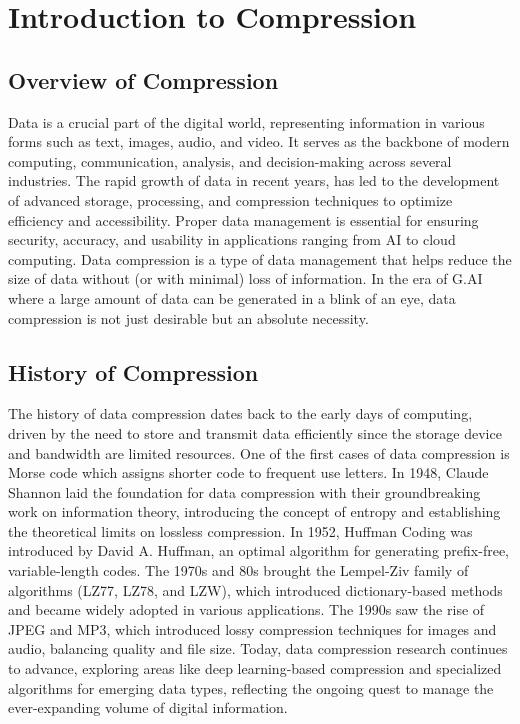 \section{Introduction to Compression}
\subsection{Overview of Compression}
Data is a crucial part of the digital world, representing information in various forms such as text, images, audio, and video. It serves as the backbone of modern computing, communication, analysis, and decision-making across several industries. The rapid growth of data in recent years, has led to the development of advanced storage, processing, and compression techniques to optimize efficiency and accessibility. Proper data management is essential for ensuring security, accuracy, and usability in applications ranging from AI to cloud computing.\newline
Data compression is a type of data management that helps reduce the size of data without (or with minimal) loss of information. In the era of G.AI where a large amount of data can be generated in a blink of an eye, data compression is not just desirable but an absolute necessity.
\subsection{History of Compression}
The history of data compression dates back to the early days of computing, driven by the need to store and transmit data efficiently since the storage device and bandwidth are limited resources. One of the first cases of data compression is Morse code which assigns shorter code to frequent use letters. In 1948, Claude Shannon laid the foundation for data compression with their groundbreaking work on information theory, introducing the concept of entropy and establishing the theoretical limits on lossless compression. In 1952, Huffman Coding was introduced by David A. Huffman, an optimal algorithm for generating prefix-free, variable-length codes. The 1970s and 80s brought the Lempel-Ziv family of algorithms (LZ77, LZ78, and LZW), which introduced dictionary-based methods and became widely adopted in various applications. The 1990s saw the rise of JPEG and MP3, which introduced lossy compression techniques for images and audio, balancing quality and file size. Today, data compression research continues to advance, exploring areas like deep learning-based compression and specialized algorithms for emerging data types, reflecting the ongoing quest to manage the ever-expanding volume of digital information.
